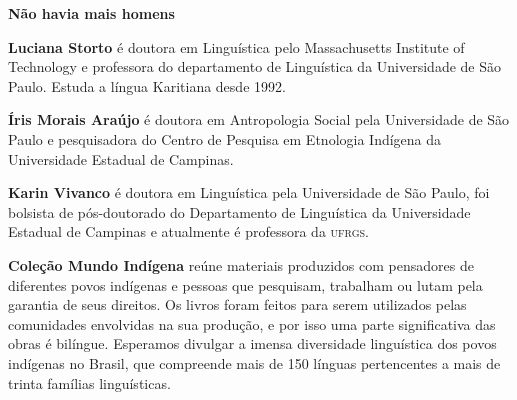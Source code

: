 \textbf{Não havia mais homens} 

\textbf{Luciana Storto} é doutora em Linguística pelo Massachusetts Institute of
Technology e professora do departamento de Linguística da Universidade
de São Paulo. Estuda a língua Karitiana desde 1992.

\textbf{Íris Morais Araújo} é doutora em Antropologia Social pela Universidade de
São Paulo e pesquisadora do Centro de Pesquisa em Etnologia Indígena da
Universidade Estadual de Campinas.

\textbf{Karin Vivanco} é doutora em Linguística pela Universidade de São Paulo,
foi bolsista de pós-doutorado do Departamento de Linguística da
Universidade Estadual de Campinas e atualmente
é professora da \textsc{ufrgs}.

\textbf{Coleção Mundo Indígena} reúne materiais produzidos com pensadores de diferentes povos indígenas e pessoas que pesquisam, trabalham ou lutam pela garantia de seus direitos. Os livros foram feitos para serem utilizados pelas comunidades envolvidas na sua produção, e por isso uma parte significativa das obras é bilíngue. Esperamos divulgar a imensa diversidade linguística dos povos indígenas no Brasil, que compreende mais de 150 línguas pertencentes a mais de trinta famílias linguísticas.

